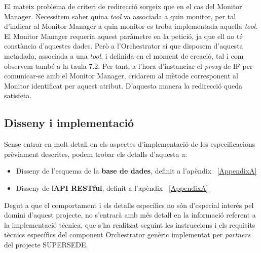 El mateix problema de criteri de redirecció sorgeix que en el cas del Monitor Manager. Necessitem saber quina \textit{tool} va associada a quin monitor, per tal d'indicar al Monitor Manager a quin monitor es troba implementada aquella \textit{tool}. El Monitor Manager requeria aquest paràmetre en la petició, ja que ell no té constància d'aquestes dades. Però a l'Orchestrator sí que disposem d'aquesta metadada, associada a una \textit{tool}, i definida en el moment de creació, tal i com observem també a la taula 7.2. Per tant, a l'hora d'instanciar el \textit{proxy} de IF per comunicar-se amb el Monitor Manager, cridarem al mètode corresponent al Monitor identificat per aquest atribut. D'aquesta manera la redirecció queda satisfeta.\\

\subsection{Disseny i implementació}

Sense entrar en molt detall en els aspectes d'implementació de les especificacions prèviament descrites, podem trobar els detalls d'aquesta a: 

\begin{itemize}
\item Disseny de l'esquema de la \textbf{base de dades}, definit a l'apèndix ~\ref{AppendixA}
\item Disseny de l\textbf{API RESTful}, definit a l'apèndix ~\ref{AppendixA}
\end{itemize}

Degut a que el comportament i els detalls específics no són d'especial interés pel domini d'aquest projecte, no s'entrarà amb més detall en la informació referent a la implementació tècnica, que s'ha realitzat seguint les instruccions i els requisits tècnics específics del component Orchestrator genèric implementat per \textit{partners} del projecte SUPERSEDE.